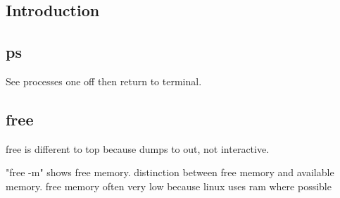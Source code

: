 
\subsection{Introduction}

\subsection{ps}


See processes one off then return to terminal.

\subsection{free}

free is different to top because dumps to out, not interactive.

"free -m" shows free memory. distinction between free memory and available memory. free memory often very low because linux uses ram where possible


